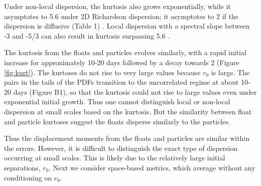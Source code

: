 \documentclass[]{ametsoc}
\begin{document}
Under non-local dispersion, the kurtosis also grows exponentially, while it asymptotes to 5.6 under 2D Richardson dispersion; it asymptotes to 2 if the dispersion is diffusive (Table 1) \citep{lacasce2010relative}. Local dispersion with a spectral slope between -3 and -5/3 can also result in kurtosis surpassing 5.6 \citep{foussard2017relative}. 

The kurtosis from the floats and particles evolves similarly, with a rapid initial increase for approximately 10-20 days followed by a decay towards 2 (Figure \ref{fig:kurt}). The kurtoses do not rise to very large values 
because $r_0$ is large. The pairs in the tails of the PDFs transition to the uncorrelated regime at about 10-20 days (Figure B1), so that the kurtosis could not rise to large values even under exponential initial growth. 
Thus one cannot distinguish local or non-local dispersion at small scales based on the kurtosis. But the similarity between float and particle kurtoses suggest the floats disperse similarly to the particles.

Thus the displacement moments from the floats and particles are similar within the errors. However, it is difficult to distinguish the exact type of dispersion occurring at small scales. 
This is likely due to the relatively large initial separations, $r_0$. 
Next we consider space-based metrics, which average without any conditioning on $r_0$. 
 
\end{document}
